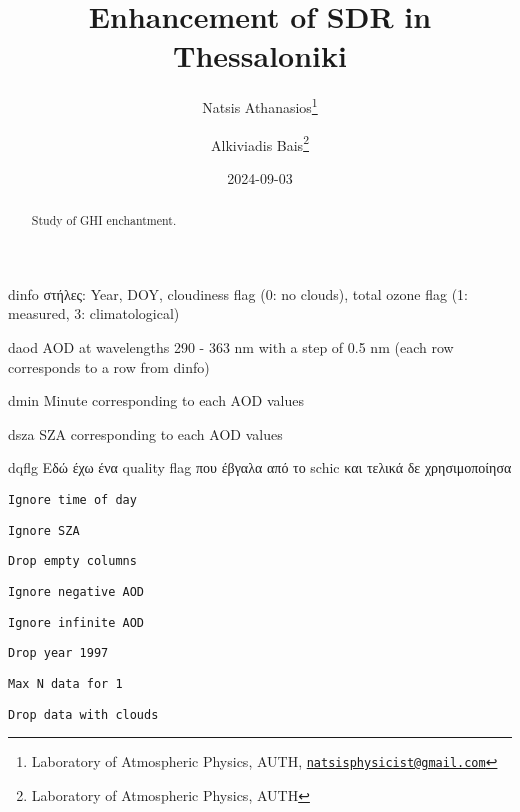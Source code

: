 \documentclass[
  10pt,
  a4paper,oneside]{article}
\title{Enhancement of SDR in Thessaloniki}
\author{Natsis Athanasios\footnote{Laboratory of Atmospheric Physics, AUTH, \href{mailto:natsisphysicist@gmail.com}{\nolinkurl{natsisphysicist@gmail.com}}} \and Alkiviadis Bais\footnote{Laboratory of Atmospheric Physics, AUTH}}
\date{2024-09-03}
\begin{document}
\maketitle
\begin{abstract}
Study of GHI enchantment.
\end{abstract}

{
\hypersetup{linkcolor=}
\setcounter{tocdepth}{4}
\tableofcontents
}
dinfo
στήλες: Year, DOY, cloudiness flag (0: no clouds), total ozone flag (1: measured, 3: climatological)

daod
AOD at wavelengths 290 - 363 nm with a step of 0.5 nm (each row corresponds to a row from dinfo)

dmin
Minute corresponding to each AOD values

dsza
SZA corresponding to each AOD values

dqflg
Εδώ έχω ένα quality flag που έβγαλα από το schic και τελικά δε χρησιμοποίησα

\begin{verbatim}
Ignore time of day
\end{verbatim}

\begin{verbatim}
Ignore SZA
\end{verbatim}

\begin{verbatim}
Drop empty columns
\end{verbatim}

\begin{verbatim}
Ignore negative AOD
\end{verbatim}

\begin{verbatim}
Ignore infinite AOD
\end{verbatim}

\begin{verbatim}
Drop year 1997
\end{verbatim}

\begin{verbatim}
Max N data for 1 
\end{verbatim}

\begin{verbatim}
Drop data with clouds
\end{verbatim}
\end{document}
